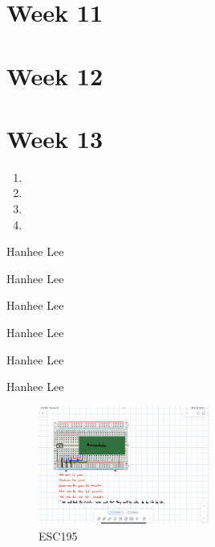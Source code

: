 \documentclass{article}
\begin{document}
    \section{Week 11}

    \section{Week 12}

    \section{Week 13}

\begin{process}
    \begin{enumerate}
        \item 
        \item 
        \item 
        \item 
    \end{enumerate}
\end{process}

\begin{example}
    Hanhee Lee
\end{example}

\begin{definition}
    
\end{definition}

\begin{theorem}
    Hanhee Lee
\end{theorem}

\begin{derivation}
    Hanhee Lee
\end{derivation}

\begin{intuition}
    Hanhee Lee
\end{intuition}

\begin{warning}
    Hanhee Lee
\end{warning}

\begin{terminology}
    Hanhee Lee
\end{terminology}

\begin{figure}[H]
    \centering
    \includegraphics[width=0.5\textwidth]{00_Images/diagram_circuit.png}
    \caption{ESC195}
\end{figure}
\end{document}
